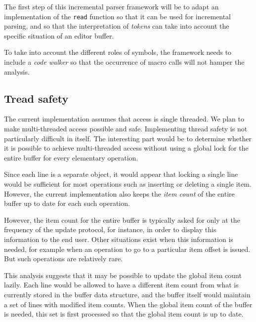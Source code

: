 The first step of this incremental parser framework will be to adapt
an implementation of the \commonlisp{} \texttt{read} function so that
it can be used for incremental parsing, and so that the interpretation
of \emph{tokens} can take into account the specific situation of an
editor buffer.

To take into account the different roles of symbols, the framework
needs to include a \emph{code walker} so that the occurrence of macro
calls will not hamper the analysis.

\subsection{Tread safety}

The current implementation assumes that access is single threaded.  We
plan to make multi-threaded access possible and safe.  Implementing
thread safety is not particularly difficult in itself.  The
interesting part would be to determine whether it is possible to
achieve multi-threaded access without using a global lock for the
entire buffer for every elementary operation.

Since each line is a separate object, it would appear that locking a
single line would be sufficient for most operations such as inserting
or deleting a single item.  However, the current implementation also
keeps the \emph{item count} of the entire buffer up to date for each
such operation.

However, the item count for the entire buffer is typically asked for
only at the frequency of the update protocol, for instance, in order
to display this information to the end user.  Other situations exist
when this information is needed, for example when an operation to go
to a particular item offset is issued.  But such operations are
relatively rare.

This analysis suggests that it may be possible to update the global
item count lazily.  Each line would be allowed to have a different
item count from what is currently stored in the buffer data structure,
and the buffer itself would maintain a set of lines with modified item
counts.  When the global item count of the buffer is needed, this set
is first processed so that the global item count is up to date.
